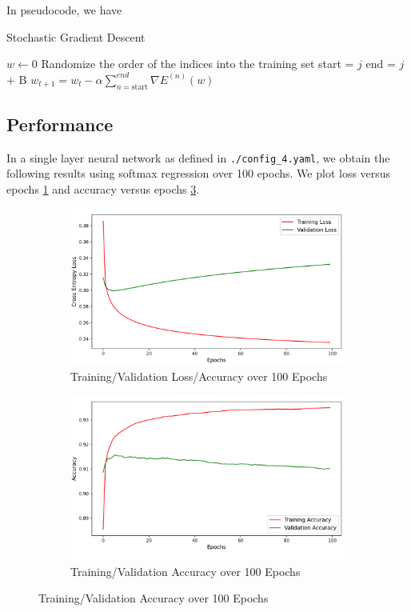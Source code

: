 In pseudocode, we have

\begin{algorithm}
	\caption{Stochastic Gradient Descent}
	\begin{algorithmic}
		\State $w \gets 0$
		\State Randomize the order of the indices into the training set
		\State start = $j$
		\State end = $j$ + B
		\State $w_{t + 1} = w_t - \alpha \sum_{n = \text{start}}^{end} \nabla
			E^{(n)}(w) $
		\EndFor
		\EndFor
	\end{algorithmic}
\end{algorithm}

\subsection{Performance}

In a single layer neural network as defined in \texttt{./config\_4.yaml}, we
obtain the following results using softmax regression over 100 epochs. We
plot loss versus epochs \cref{fig:loss} and accuracy versus epochs \cref{fig:acc}.

\begin{figure}[H]
	\begin{subfigure}{0.5\textwidth}
		\centering
		\includegraphics[width=1.0\textwidth]{./images/loss.png}
		\caption{Training/Validation Loss/Accuracy over 100 Epochs}
		\label{fig:loss}
	\end{subfigure}
	\begin{subfigure}{0.5\textwidth}
		\centering
		\includegraphics[width=1.0\textwidth]{./images/acc.png}
		\caption{Training/Validation Accuracy over 100 Epochs}
		\label{fig:acc}
	\end{subfigure}
\end{figure}
